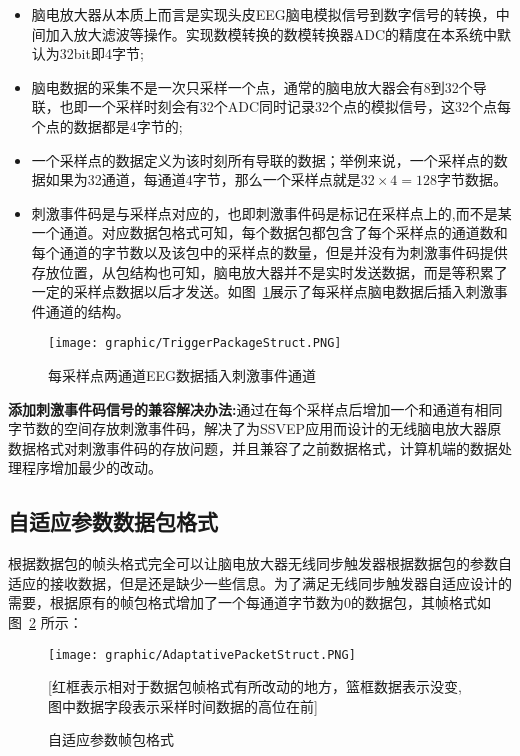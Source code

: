 \begin{itemize}
\item 脑电放大器从本质上而言是实现头皮EEG脑电模拟信号到数字信号的转换，中间加入放大滤波等操作。实现数模转换的数模转换器ADC的精度在本系统中默认为32bit即4字节;
\item 脑电数据的采集不是一次只采样一个点，通常的脑电放大器会有8到32个导联，也即一个采样时刻会有32个ADC同时记录32个点的模拟信号，这32个点每个点的数据都是4字节的;
\item 一个采样点的数据定义为该时刻所有导联的数据；举例来说，一个采样点的数据如果为32通道，每通道4字节，那么一个采样点就是$32 \times 4 = 128 $字节数据。
\item  刺激事件码是与采样点对应的，也即刺激事件码是标记在采样点上的,而不是某一个通道。对应数据包格式可知，每个数据包都包含了每个采样点的通道数和每个通道的字节数以及该包中的采样点的数量，但是并没有为刺激事件码提供存放位置，从包结构也可知，脑电放大器并不是实时发送数据，而是等积累了一定的采样点数据以后才发送。如图~\ref{TriggerPackage}展示了每采样点脑电数据后插入刺激事件通道的结构。

\end{itemize}

\begin{figure}[!hbp]
\begin{center}
\texttt{[image: graphic/TriggerPackageStruct.PNG]}
\caption{每采样点两通道EEG数据插入刺激事件通道 \label{TriggerPackage}}
\end{center}
\end{figure}

\textbf{添加刺激事件码信号的兼容解决办法:}通过在每个采样点后增加一个和通道有相同字节数的空间存放刺激事件码，解决了为SSVEP应用而设计的无线脑电放大器原数据格式对刺激事件码的存放问题，并且兼容了之前数据格式，计算机端的数据处理程序增加最少的改动。

\subsection{自适应参数数据包格式 \label{sec:adaptativePac}}
	根据数据包的帧头格式完全可以让脑电放大器无线同步触发器根据数据包的参数自适应的接收数据，但是还是缺少一些信息。为了满足无线同步触发器自适应设计的需要，根据原有的帧包格式增加了一个每通道字节数为0的数据包，其帧格式如图~\ref{AdaptParaPackage} 所示：

\begin{figure}[!hbp]
\begin{center}
\texttt{[image: graphic/AdaptativePacketStruct.PNG]}
\caption{自适应参数帧包格式 \label{AdaptParaPackage}}
[红框表示相对于数据包帧格式有所改动的地方，篮框数据表示没变,图中数据字段表示采样时间数据的高位在前]
\end{center}
\end{figure}

